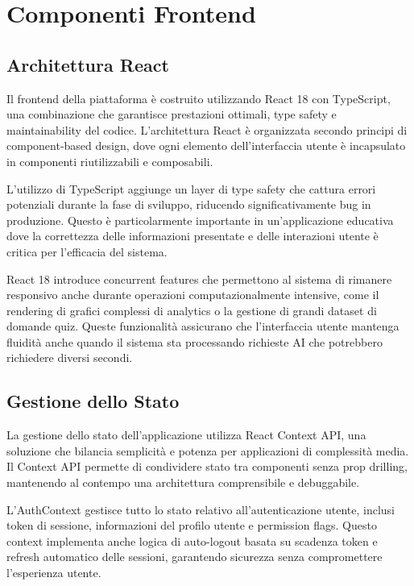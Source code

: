 \documentclass[12pt,a4paper]{article}
\begin{document}
\section{Componenti Frontend}

\subsection{Architettura React}

Il frontend della piattaforma è costruito utilizzando React 18 con TypeScript, una combinazione che garantisce prestazioni ottimali, type safety e maintainability del codice. L'architettura React è organizzata secondo principi di component-based design, dove ogni elemento dell'interfaccia utente è incapsulato in componenti riutilizzabili e composabili.

L'utilizzo di TypeScript aggiunge un layer di type safety che cattura errori potenziali durante la fase di sviluppo, riducendo significativamente bug in produzione. Questo è particolarmente importante in un'applicazione educativa dove la correttezza delle informazioni presentate e delle interazioni utente è critica per l'efficacia del sistema.

React 18 introduce concurrent features che permettono al sistema di rimanere responsivo anche durante operazioni computazionalmente intensive, come il rendering di grafici complessi di analytics o la gestione di grandi dataset di domande quiz. Queste funzionalità assicurano che l'interfaccia utente mantenga fluidità anche quando il sistema sta processando richieste AI che potrebbero richiedere diversi secondi.

\subsection{Gestione dello Stato}

La gestione dello stato dell'applicazione utilizza React Context API, una soluzione che bilancia semplicità e potenza per applicazioni di complessità media. Il Context API permette di condividere stato tra componenti senza prop drilling, mantenendo al contempo una architettura comprensibile e debuggabile.

L'AuthContext gestisce tutto lo stato relativo all'autenticazione utente, inclusi token di sessione, informazioni del profilo utente e permission flags. Questo context implementa anche logica di auto-logout basata su scadenza token e refresh automatico delle sessioni, garantendo sicurezza senza compromettere l'esperienza utente.
\end{document}
